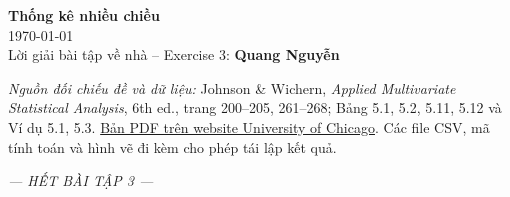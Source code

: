 \documentclass[11pt,a4paper]{article}
\newcommand{\coursename}{Thống kê nhiều chiều}
\newcommand{\docdate}{\today}
\newcommand{\doctitle}{Lời giải bài tập về nhà -- Exercise 3}
\newcommand{\studentname}{Quang Nguyễn}
\begin{document}
\begin{center}
  {\bfseries\coursename}\\
  \docdate\\
  \doctitle: \textbf{\studentname}
\end{center}
\vspace{0.5em}





\medskip
\noindent\textit{Nguồn đối chiếu đề và dữ liệu:} Johnson \& Wichern,
\textit{Applied Multivariate Statistical Analysis}, 6th ed., trang 200--205,
261--268; Bảng 5.1, 5.2, 5.11, 5.12 và Ví dụ 5.1, 5.3.
\href{https://www.stat.uchicago.edu/~lekheng/courses/331/books/Johnson-Wichern%20-%20Applied%20Multivariate%20Analysis.pdf}{Bản PDF trên website University of Chicago}.
Các file CSV, mã tính toán và hình vẽ đi kèm cho phép tái lập kết quả.
\vfill
\begin{center}{\small\itshape --- HẾT BÀI TẬP 3 ---}\end{center}
\end{document}
